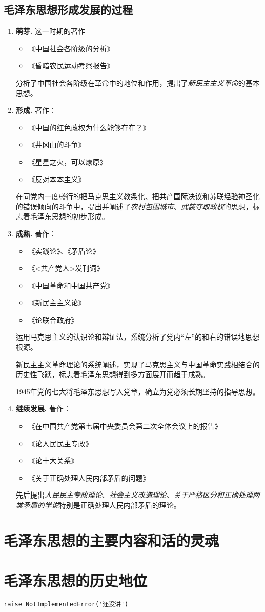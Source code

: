\subsection{毛泽东思想形成发展的过程}
\begin{enumerate}
    \item \textbf{萌芽.} 这一时期的著作
    \begin{itemize}
        \item 《中国社会各阶级的分析》
        \item 《昏暗农民运动考察报告》
    \end{itemize}
    分析了中国社会各阶级在革命中的地位和作用，提出了\emph{新民主主义革命}的基本思想。
    \item \textbf{形成.} 著作：
    \begin{itemize}
        \item 《中国的红色政权为什么能够存在？》
        \item 《井冈山的斗争》
        \item 《星星之火，可以燎原》
        \item 《反对本本主义》
    \end{itemize}
    在同党内一度盛行的把马克思主义教条化、把共产国际决议和苏联经验神圣化的错误倾向的斗争中，提出并阐述了\emph{农村包围城市}、\emph{武装夺取政权}的思想，标志着毛泽东思想的初步形成。
    \item \textbf{成熟.} 著作：
    \begin{itemize}
        \item 《实践论》、《矛盾论》
        \item 《<共产党人>发刊词》
        \item 《中国革命和中国共产党》
        \item 《新民主主义论》
        \item 《论联合政府》
    \end{itemize}
    运用马克思主义的认识论和辩证法，系统分析了党内“左”的和右的错误地思想根源。

    新民主主义革命理论的系统阐述，实现了马克思主义与中国革命实践相结合的历史性飞跃，标志着毛泽东思想得到多方面展开而趋于成熟。

    1945年党的七大将毛泽东思想写入党章，确立为党必须长期坚持的指导思想。
    \item \textbf{继续发展.} 著作：
    \begin{itemize}
        \item 《在中国共产党第七届中央委员会第二次全体会议上的报告》
        \item 《论人民民主专政》
        \item 《论十大关系》
        \item 《关于正确处理人民内部矛盾的问题》
    \end{itemize}
    先后提出\emph{人民民主专政理论}、\emph{社会主义改造理论}、\emph{关于严格区分和正确处理两类矛盾的学说}特别是正确处理人民内部矛盾的理论。
\end{enumerate}

\section{毛泽东思想的主要内容和活的灵魂}
\section{毛泽东思想的历史地位}
\verb|raise NotImplementedError('还没讲')|